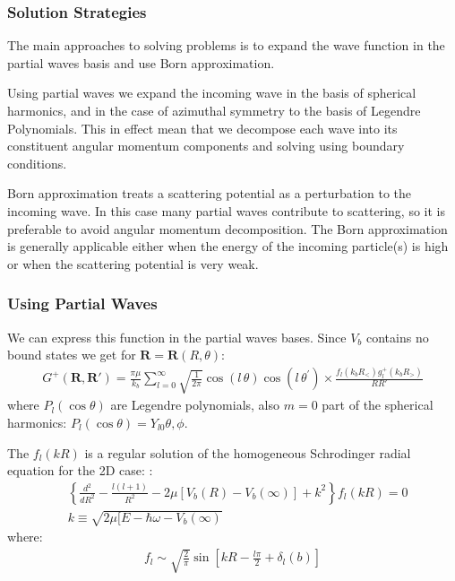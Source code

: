 \subsubsection{Solution Strategies}
The main approaches to solving problems is to expand the wave function in the partial waves basis and use Born approximation.

Using partial waves  we expand the incoming wave in the basis of spherical harmonics, and in the case of azimuthal symmetry to the basis of Legendre Polynomials. This in effect mean that we decompose each wave into its constituent angular momentum components and solving using boundary conditions.

Born approximation \cite{GQuantum} treats a scattering potential as a perturbation to the incoming wave. In this case many partial waves contribute to scattering, so it is preferable to avoid angular momentum decomposition. The Born approximation is generally applicable either when the energy of the incoming particle(s) is high or when the scattering potential is very weak. 

\subsubsection{Using Partial Waves}

We can express this function in the partial waves bases. Since $ V_b $ contains no bound states we get for $ \mathbf{R} = \mathbf{R}(R,\theta) $:
\begin{equation}\label{GreenFka2}
\begin{split}
G^{+}(\mathbf{R}, \mathbf{R}') =  \frac{\pi\mu}{k_b}\sum_{l=0}^{\infty}{\sqrt{\frac{1}{2\pi}}\cos(l\,\theta)\cos(l\,\theta^{'})}\times \frac{f_l(k_bR_{<})g^{+}_l(k_bR_{>})}{RR'}
\end{split}
\end{equation}
where $ P_l(\cos\theta) $ are Legendre polynomials, also $ m = 0 $ part of the spherical harmonics:  $ P_l(\cos\theta) = Y_{l0}{\theta,\phi} $. 

The $ f_l(k R) $ is a regular solution of the homogeneous Schrodinger radial  equation for the 2D case: \cite{H2atom}:
\begin{equation}\label{eqRadial1}
\begin{split}
& \left\{\frac{d^2}{dR^2} - \frac{l(l+1)}{R^2} - 2\mu\left[V_b(R) - V_b(\infty)\right] + k^2\right\}f_l(kR) = 0 \\[.8em]
& k \equiv \sqrt{2\mu[E - \hbar\omega - V_b(\infty)}
\end{split}
\end{equation}
where:
\begin{equation}
\begin{split}
f_{l} \sim \sqrt{\frac{2}{\pi}}\sin\left[kR - \frac{l\pi}{2} + \delta_l(b)\right]
\end{split}
\end{equation}

